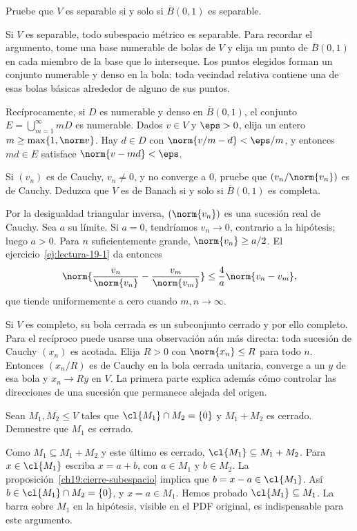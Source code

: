 \begin{ejercicio}\label{ej:lectura-19-4}
Pruebe que $V$ es separable si y solo si $\overline B(0,1)$ es separable.
\end{ejercicio}
\begin{solucion}
Si $V$ es separable, todo subespacio métrico es separable. Para recordar el argumento, tome una base numerable de bolas de $V$ y elija un punto de $\overline B(0,1)$ en cada miembro de la base que lo interseque. Los puntos elegidos forman un conjunto numerable y denso en la bola: toda vecindad relativa contiene una de esas bolas básicas alrededor de alguno de sus puntos.

Recíprocamente, si $D$ es numerable y denso en $\overline B(0,1)$, el conjunto $E=\bigcup_{m=1}^{\infty}mD$ es numerable. Dados $v\in V$ y $\eps>0$, elija un entero $m\geq\max\{1,\norm v\}$. Hay $d\in D$ con $\norm{v/m-d}<\eps/m$, y entonces $md\in E$ satisface $\norm{v-md}<\eps$.
\end{solucion}

\begin{ejercicio}\label{ej:lectura-19-5}
Si $(v_n)$ es de Cauchy, $v_n\ne0$, y no converge a $0$, pruebe que $(v_n/\norm{v_n})$ es de Cauchy. Deduzca que $V$ es de Banach si y solo si $\overline B(0,1)$ es completa.
\end{ejercicio}
\begin{solucion}
Por la desigualdad triangular inversa, $(\norm{v_n})$ es una sucesión real de Cauchy. Sea $a$ su límite. Si $a=0$, tendríamos $v_n\to0$, contrario a la hipótesis; luego $a>0$. Para $n$ suficientemente grande, $\norm{v_n}\geq a/2$. El ejercicio~\ref{ej:lectura-19-1} da entonces
\[
 \norm{\frac{v_n}{\norm{v_n}}-\frac{v_m}{\norm{v_m}}}\leq\frac4a\norm{v_n-v_m},
\]
que tiende uniformemente a cero cuando $m,n\to\infty$.

Si $V$ es completo, su bola cerrada es un subconjunto cerrado y por ello completo. Para el recíproco puede usarse una observación aún más directa: toda sucesión de Cauchy $(x_n)$ es acotada. Elija $R>0$ con $\norm{x_n}\leq R$ para todo $n$. Entonces $(x_n/R)$ es de Cauchy en la bola cerrada unitaria, converge a un $y$ de esa bola y $x_n\to Ry$ en $V$. La primera parte explica además cómo controlar las direcciones de una sucesión que permanece alejada del origen.
\end{solucion}

\begin{ejercicio}\label{ej:lectura-19-6}
Sean $M_1,M_2\leq V$ tales que $\cl{M_1}\cap M_2=\{0\}$ y $M_1+M_2$ es cerrado. Demuestre que $M_1$ es cerrado.
\end{ejercicio}
\begin{solucion}
Como $M_1\subseteq M_1+M_2$ y este último es cerrado, $\cl{M_1}\subseteq M_1+M_2$. Para $x\in\cl{M_1}$ escriba $x=a+b$, con $a\in M_1$ y $b\in M_2$. La proposición~\ref{ch19:cierre-subespacio} implica que $b=x-a\in\cl{M_1}$. Así $b\in\cl{M_1}\cap M_2=\{0\}$, y $x=a\in M_1$. Hemos probado $\cl{M_1}\subseteq M_1$. La barra sobre $M_1$ en la hipótesis, visible en el PDF original, es indispensable para este argumento.
\end{solucion}

